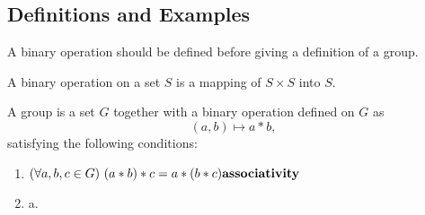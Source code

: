 \documentclass[../main.tex]{subfiles}
\begin{document}
\subsection{Definitions and Examples}
A binary operation should be defined before giving a definition of a group.

\begin{defn}\label{def:binaryop}
    A \textsf{binary operation} on a set $S$ is a mapping of $S \times S$ into $S$.
\end{defn}

\begin{defn}\label{def:group}
    A \textsf{group} is a set $G$ together with a binary operation defined on $G$ as
    \[
        (a, b) \mapsto a * b,
    \]
    satisfying the following conditions:
    \begin{enumerate}
        \item $(\forall a, b, c \in G)\ (a * b) * c = a * (b * c) \hfill \textbf{associativity}$
        \item a.
    \end{enumerate}
\end{defn}
\end{document}
